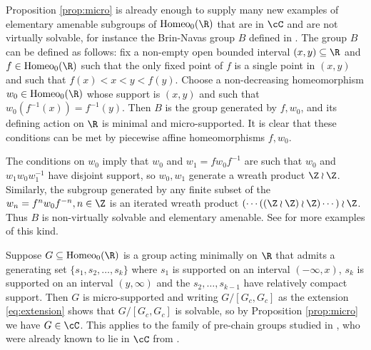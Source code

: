 \documentclass[reqno]{amsart}
\begin{document}
\begin{ejm}
Proposition \ref{prop:micro} is already enough to supply many new examples of elementary amenable subgroups of $\mathrm{Homeo}_0(\R)$ that are in $\cC$ and are not virtually solvable, for instance the Brin-Navas group $B$ defined in \cite{Navas2004, Brin2005}. The group $B$ can be defined as follows: fix a non-empty open bounded interval $(x,y) \subseteq \R$ and $f \in \mathrm{Homeo}_0(\R)$ such that the only fixed point of $f$ is a single point in $(x,y)$ and such that $f(x) < x < y < f(y)$. Choose a non-decreasing homeomorphism $w_0 \in \mathrm{Homeo}_0(\R)$ whose support is $(x,y)$ and such that $w_0(f^{-1}(x)) = f^{-1}(y)$. Then $B$ is the group generated by $f, w_0$, and its defining action on $\R$ is minimal and micro-supported. It is clear that these conditions can be met by piecewise affine homeomorphisms $f, w_0$.

The conditions on $w_0$ imply that $w_0$ and $w_1 = f w_0 f^{-1}$ are such that $w_0$ and $w_1 w_0 w_1^{-1}$ have disjoint support, so $w_0, w_1$ generate a wreath product $\Z \wr \Z$. Similarly, the subgroup generated by any finite subset of the $w_n = f^n w_0 f^{-n}, n \in \Z$ is an iterated wreath product $(\cdots ((\Z \wr \Z) \wr \Z) \cdots )\wr \Z$. Thus $B$ is non-virtually solvable and elementary amenable. See \cite{BleakBrinMoore2021} for more examples of this kind.%
\end{ejm}

\begin{rmk}
Suppose $G \subseteq \mathrm{Homeo}_0(\R)$ is a group acting minimally on $\R$ that admits a generating set $\{s_1, s_2, \ldots, s_k\}$ where $s_1$ is supported on an interval $(-\infty, x)$, $s_k$ is supported on an interval $(y, \infty)$ and the $s_2, \ldots, s_{k-1}$ have relatively compact support. Then $G$ is micro-supported and writing $G/[G_c, G_c]$ as the extension \eqref{eq:extension} shows that $G/[G_c, G_c]$ is solvable, so by Proposition \ref{prop:micro} we have $G \in \cC$. This applies to the family of pre-chain groups studied in \cite{KimKoberdaLodha2019}, who were already known to lie in $\cC$ from \cite[Section 16.3.3]{BMRT}.
\end{rmk}
\end{document}
